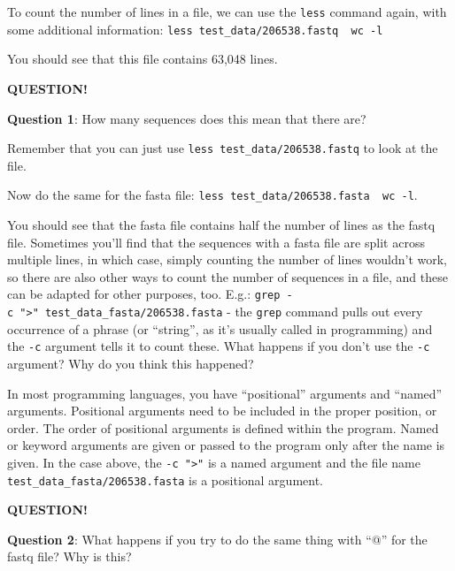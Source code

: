 \documentclass[
]{book}
\newenvironment{bluebox}{
  \definecolor{shadecolor}{RGB}{172, 210, 237}
  \color{white}
  \begin{shaded}}
 {\end{shaded}}
\begin{document}
To count the number of lines in a file, we can use the \texttt{less} command again, with some additional information: \texttt{less\ test\_data/206538.fastq\ \textbar{}\ wc\ -l}

You should see that this file contains 63,048 lines.

\begin{bluebox}

\begin{center}
\textbf{QUESTION!}

\end{center}

\textbf{Question 1}: How many sequences does this mean that there are?

\end{bluebox}

Remember that you can just use \texttt{less\ test\_data/206538.fastq} to look at the file.

Now do the same for the fasta file: \texttt{less\ test\_data/206538.fasta\ \textbar{}\ wc\ -l}.

You should see that the fasta file contains half the number of lines as the fastq file. Sometimes you'll find that the sequences with a fasta file are split across multiple lines, in which case, simply counting the number of lines wouldn't work, so there are also other ways to count the number of sequences in a file, and these can be adapted for other purposes, too. E.g.: \texttt{grep\ -c\ "\textgreater{}"\ test\_data\_fasta/206538.fasta} - the \texttt{grep} command pulls out every occurrence of a phrase (or ``string'', as it's usually called in programming) and the \texttt{-c} argument tells it to count these. What happens if you don't use the \texttt{-c} argument? Why do you think this happened?

In most programming languages, you have ``positional'' arguments and ``named'' arguments. Positional arguments need to be included in the proper position, or order. The order of positional arguments is defined within the program. Named or keyword arguments are given or passed to the program only after the name is given. In the case above, the \texttt{-c\ "\textgreater{}"} is a named argument and the file name \texttt{test\_data\_fasta/206538.fasta} is a positional argument.

\begin{bluebox}

\begin{center}
\textbf{QUESTION!}

\end{center}

\textbf{Question 2}: What happens if you try to do the same thing with ``@'' for the fastq file? Why is this?

\end{bluebox}
\end{document}
